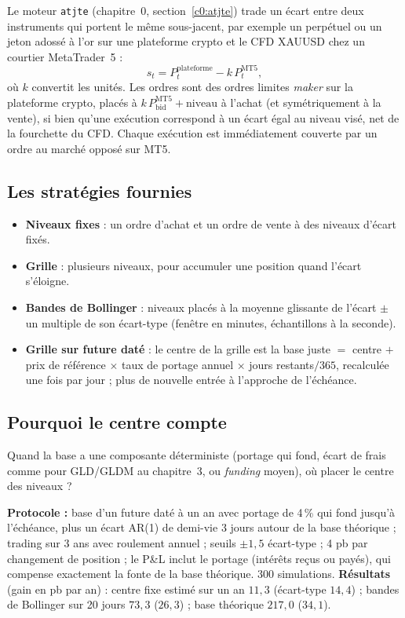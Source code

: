 Le moteur \texttt{atjte} \citep{atjte} (chapitre~0, section~\ref{c0:atjte}) trade un écart entre deux instruments qui portent le même sous-jacent, par exemple un perpétuel ou un jeton adossé à l'or sur une plateforme crypto et le CFD XAUUSD chez un courtier MetaTrader~5 :
\[
s_t = P^{\text{plateforme}}_t - k\,P^{\text{MT5}}_t,
\]
où $k$ convertit les unités. Les ordres sont des ordres limites \emph{maker} sur la plateforme crypto, placés à $k\,P^{\text{MT5}}_{\text{bid}} + \text{niveau}$ à l'achat (et symétriquement à la vente), si bien qu'une exécution correspond à un écart égal au niveau visé, net de la fourchette du CFD. Chaque exécution est immédiatement couverte par un ordre au marché opposé sur MT5.

\subsection{Les stratégies fournies}

\begin{itemize}
\item \textbf{Niveaux fixes} : un ordre d'achat et un ordre de vente à des niveaux d'écart fixés.
\item \textbf{Grille} : plusieurs niveaux, pour accumuler une position quand l'écart s'éloigne.
\item \textbf{Bandes de Bollinger} : niveaux placés à la moyenne glissante de l'écart $\pm$ un multiple de son écart-type (fenêtre en minutes, échantillons à la seconde).
\item \textbf{Grille sur future daté} : le centre de la grille est la base \og juste\fg{} $=$ centre $+$ prix de référence $\times$ taux de portage annuel $\times$ jours restants$/365$, recalculée une fois par jour ; plus de nouvelle entrée à l'approche de l'échéance.
\end{itemize}

\subsection{Pourquoi le centre compte}

Quand la base a une composante déterministe (portage qui fond, écart de frais comme pour GLD/GLDM au chapitre~3, ou \emph{funding} moyen), où placer le centre des niveaux ?

\begin{codebox}
\textbf{Protocole :} base d'un future daté à un an avec portage de 4\,\% qui fond jusqu'à l'échéance, plus un écart AR(1) de demi-vie 3 jours autour de la base théorique ; trading sur 3 ans avec roulement annuel ; seuils $\pm1{,}5$ écart-type ; 4 pb par changement de position ; le P\&L inclut le portage (intérêts reçus ou payés), qui compense exactement la fonte de la base théorique. 300 simulations. \textbf{Résultats} (gain en pb par an) : centre fixe estimé sur un an $11{,}3$ (écart-type $14{,}4$) ; bandes de Bollinger sur 20 jours $73{,}3$ ($26{,}3$) ; base théorique $217{,}0$ ($34{,}1$).
\end{codebox}

